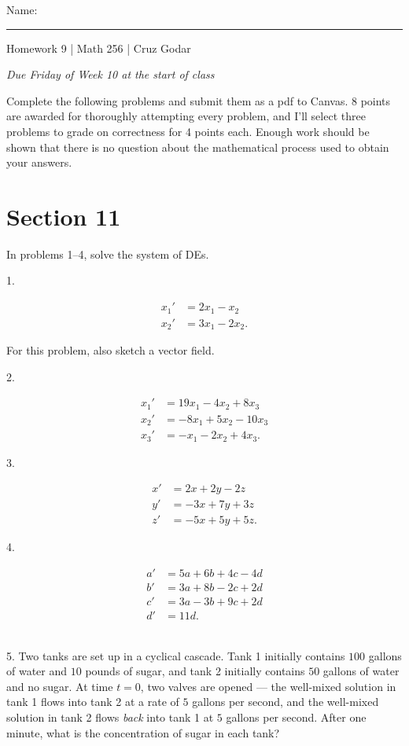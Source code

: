 \documentclass{article}
\begin{document}
\Large Name: \rule{2in}{0.15mm} \hfill Homework 9 | Math 256 | Cruz Godar \vspace{4pt}  \normalsize

\textit{Due Friday of Week 10 at the start of class}

Complete the following problems and submit them as a pdf to Canvas. 8 points are awarded for thoroughly attempting every problem, and I'll select three problems to grade on correctness for 4 points each. Enough work should be shown that there is no question about the mathematical process used to obtain your answers.

\section{Section 11}

In problems 1--4, solve the system of DEs.

1.

\begin{align*}
	x_1' &= 2x_1 - x_2\\
	x_2' &= 3x_1 - 2x_2.
\end{align*}

For this problem, also sketch a vector field.

2.

\begin{align*}
	x_1' &= 19x_1 - 4x_2 + 8x_3\\
	x_2' &= -8x_1 + 5x_2 - 10x_3\\
	x_3' &= -x_1 - 2x_2 + 4x_3.
\end{align*}

3.

\begin{align*}
	x' &= 2x + 2y - 2z\\
	y' &= -3x + 7y + 3z\\
	z' &= -5x + 5y + 5z.
\end{align*}

4.

\begin{align*}
	a' &= 5a + 6b + 4c - 4d\\
	b' &= 3a + 8b - 2c + 2d\\
	c' &= 3a - 3b + 9c + 2d\\
	d' &= 11d.
\end{align*}

~\\

5. Two tanks are set up in a cyclical cascade. Tank 1 initially contains $100$ gallons of water and $10$ pounds of sugar, and tank 2 initially contains $50$ gallons of water and no sugar. At time $t = 0$, two valves are opened --- the well-mixed solution in tank 1 flows into tank 2 at a rate of $5$ gallons per second, and the well-mixed solution in tank 2 flows \textit{back} into tank 1 at $5$ gallons per second. After one minute, what is the concentration of sugar in each tank?
\end{document}
